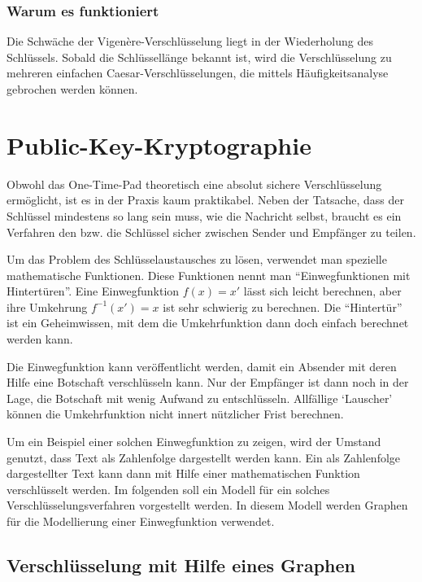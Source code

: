 \documentclass[
  nswissgerman,
  a4paper,
  DIV=11,
  numbers=noendperiod,
  ngerman]{scrreprt}
\begin{document}
\subsection{Warum es funktioniert}\label{warum-es-funktioniert}

Die Schwäche der Vigenère-Verschlüsselung liegt in der Wiederholung des
Schlüssels. Sobald die Schlüssellänge bekannt ist, wird die
Verschlüsselung zu mehreren einfachen Caesar-Verschlüsselungen, die
mittels Häufigkeitsanalyse gebrochen werden können.

\chapter{Public-Key-Kryptographie}\label{public-key-kryptographie}

Obwohl das One-Time-Pad theoretisch eine absolut sichere Verschlüsselung
ermöglicht, ist es in der Praxis kaum praktikabel. Neben der Tatsache,
dass der Schlüssel mindestens so lang sein muss, wie die Nachricht
selbst, braucht es ein Verfahren den bzw. die Schlüssel sicher zwischen
Sender und Empfänger zu teilen.

Um das Problem des Schlüsselaustausches zu lösen, verwendet man
spezielle mathematische Funktionen. Diese Funktionen nennt man
``Einwegfunktionen mit Hintertüren''. Eine Einwegfunktion \(f(x) = x'\)
lässt sich leicht berechnen, aber ihre Umkehrung \(f^{-1}(x') = x\) ist
sehr schwierig zu berechnen. Die ``Hintertür'' ist ein Geheimwissen, mit
dem die Umkehrfunktion dann doch einfach berechnet werden kann.

Die Einwegfunktion kann veröffentlicht werden, damit ein Absender mit
deren Hilfe eine Botschaft verschlüsseln kann. Nur der Empfänger ist
dann noch in der Lage, die Botschaft mit wenig Aufwand zu entschlüsseln.
Allfällige `Lauscher' können die Umkehrfunktion nicht innert nützlicher
Frist berechnen.

Um ein Beispiel einer solchen Einwegfunktion zu zeigen, wird der Umstand
genutzt, dass Text als Zahlenfolge dargestellt werden kann. Ein als
Zahlenfolge dargestellter Text kann dann mit Hilfe einer mathematischen
Funktion verschlüsselt werden. Im folgenden soll ein Modell für ein
solches Verschlüsselungsverfahren vorgestellt werden. In diesem Modell
werden Graphen für die Modellierung einer Einwegfunktion verwendet.

\section{Verschlüsselung mit Hilfe eines
Graphen}\label{verschluxfcsselung-mit-hilfe-eines-graphen}
\end{document}
